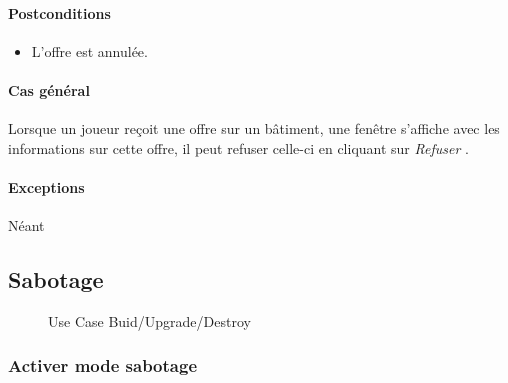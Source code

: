 \documentclass[a4paper,11pt]{report}
\begin{document}
\paragraph{Postconditions}
\begin{itemize}
 \item L'offre est annulée.
\end{itemize}
\paragraph{Cas général}
Lorsque un joueur reçoit une offre sur un bâtiment, une fenêtre s'affiche avec les informations sur cette offre, il peut refuser celle-ci en cliquant sur \og \textit{Refuser} \fg.
\paragraph{Exceptions} Néant


\newpage
\subsection{Sabotage}
\begin{figure}[ht]
	\caption{Use Case Buid/Upgrade/Destroy}
\end{figure}

\subsubsection{Activer mode sabotage}
\end{document}
